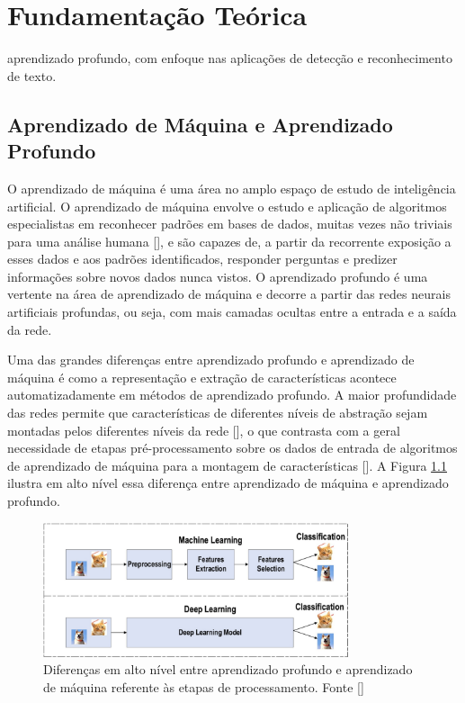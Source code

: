 \chapter{Fundamentação Teórica}

aprendizado profundo, com enfoque nas aplicações de detecção e reconhecimento de texto.

\section{Aprendizado de Máquina e Aprendizado Profundo}
O aprendizado de máquina é uma área no amplo espaço de estudo de inteligência artificial. O aprendizado de máquina 
envolve o estudo e aplicação de algoritmos especialistas em reconhecer padrões em bases de dados, muitas vezes não 
triviais para uma análise humana [], e são capazes de, a partir da recorrente exposição a 
esses dados e aos padrões identificados, responder perguntas e predizer informações sobre novos dados nunca vistos. 
O aprendizado profundo é uma vertente na área de aprendizado de máquina e decorre a partir das redes neurais artificiais 
profundas, ou seja, com mais camadas ocultas entre a entrada e a saída da rede.

Uma das grandes diferenças entre aprendizado profundo e aprendizado de máquina é como a representação e extração de 
características acontece automatizadamente em métodos de aprendizado profundo. A maior profundidade das redes permite 
que características de diferentes níveis de abstração sejam montadas pelos diferentes níveis da rede 
[], o que contrasta com a geral necessidade de etapas pré-processamento sobre os 
dados de entrada de algoritmos de aprendizado de máquina para a montagem de características []. 
A Figura \ref{fig:dl_vs_ml} ilustra em alto nível essa diferença entre aprendizado de máquina e aprendizado profundo.

\begin{figure}
    \centering
    \includegraphics[width=0.8\textwidth]{figs/theory-ml-vs-dl.png}
    \caption{Diferenças em alto nível entre aprendizado profundo e aprendizado de máquina referente às etapas de processamento. Fonte []}
    \label{fig:dl_vs_ml}
\end{figure}

